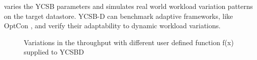 \documentclass[conference]{IEEEtran}
\begin{document}
           varies the YCSB parameters and simulates real world workload variation patterns on the target datastore.
            YCSB-D can benchmark adaptive frameworks, like OptCon \cite{OptCOnCCGRid2016}, and verify their adaptability to dynamic workload variations.
\begin{figure}[htpb]
\centering
{}\hfill
{}\hfill
{}\hfill
\caption{Variations in the throughput with different user defined function f(x) supplied to YCSBD}
\end{figure}
\end{document}
